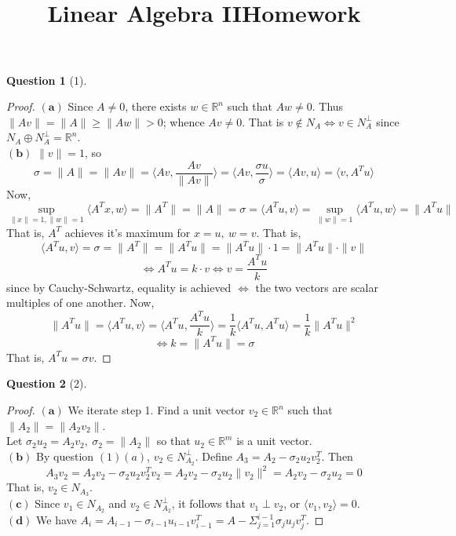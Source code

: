 \documentclass[11pt]{article}
\title{\vspace{-50pt}
\Huge \name
\\\vspace{20pt}
\huge Linear Algebra II\hfill Homework \hw}
\author{}
\date{}
\theoremstyle{quest}
\newtheorem*{question}{Question}
\begin{document}
\maketitle

\begin{question}[1]
\end{question}
\begin{proof}
$\mathbf{(a)}$ Since $A \ne 0$, there exists $w \in \mathbb{R}^{n}$ such that $Aw \ne 0$. Thus
\\$\|Av\| = \|A\| \ge \|Aw\| > 0$; whence $Av \ne 0$. That is $v \not\in N_A \iff v \in N_A^{\perp}$ since $N_A \oplus N_A^{\perp} = \mathbb{R}^n$.
\\$\mathbf{(b)}$ $\|v\| = 1$, so
$$\sigma = \|A\| = \|Av\| = \langle Av, \frac{Av}{\|Av\|} \rangle = \langle Av, \frac{\sigma u}{\sigma} \rangle = \langle Av, u \rangle = \langle v, A^T u \rangle$$
Now,
$$\sup_{\|x\|=1, \|w\| = 1}\langle A^Tx, w \rangle = \|A^T\| = \|A\| = \sigma = \langle A^Tu, v  \rangle = \sup_{\|w\|=1} \langle A^Tu, w \rangle = \|A^Tu\|$$
That is, $A^T$ achieves it's maximum for $x = u,\ w=v$. That is,
$$\langle A^Tu, v  \rangle = \sigma = \|A^T\| = \|A^Tu\| = \|A^Tu\| \cdot 1 = \|A^Tu\| \cdot \|v\|$$
$$\iff A^Tu = k \cdot v \iff v = \dfrac{A^Tu}{k}$$
since by Cauchy-Schwartz, equality is achieved $\iff$ the two vectors are scalar multiples of one another. Now,
$$\|A^Tu\| = \langle A^Tu, v\rangle = \langle A^Tu, \dfrac{A^Tu}{k}\rangle = \dfrac{1}{k} \langle A^Tu, A^Tu \rangle = \dfrac{1}{k} \|A^Tu\|^2$$
$$\iff k = \|A^Tu\| = \sigma$$
That is, $A^Tu = \sigma v$.

\end{proof}

\begin{question}[2]
\end{question}
\begin{proof}
$\mathbf{(a)}$ We iterate step 1. Find a unit vector $v_2 \in \mathbb{R}^n$ such that $\|A_2\| = \|A_2v_2\|$.
\\Let $\sigma_2 u_2 = A_2 v_2,\ \sigma_2 = \|A_2\|$ so that $u_2 \in \mathbb{R}^m$ is a unit vector.
\\$\mathbf{(b)}$ By question $(1)(a)$, $v_2 \in N_{A_2}^{\perp}$. Define $A_3 = A_2 - \sigma_2 u_2 v_2^T$. Then
$$A_3 v_2 = A_2 v_2 - \sigma_2 u_2 v_2^Tv_2 = A_2 v_2 - \sigma_2 u_2 \|v_2\|^2 = A_2 v_2 - \sigma_2 u_2 = 0$$
That is, $v_2 \in N_{A_3}$.
\\$\mathbf{(c)}$ Since $v_1 \in N_{A_2}$ and $v_2 \in N_{A_2}^{\perp}$, it follows that $v_1 \perp v_2$, or $\langle v_1, v_2 \rangle = 0$.
\\$\mathbf{(d)}$ We have $A_i = A_{i-1} - \sigma_{i-1} u_{i-1} v_{i-1}^T = A - \Sigma_{j=1}^{i-1} \sigma_j u_j v_j^T$.
\end{proof}
\end{document}
